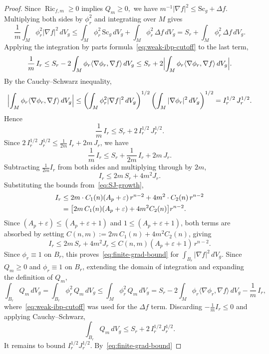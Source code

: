 \documentclass[12pt,oneside,a4paper]{article}
\theoremstyle{mytheorem}
\theoremstyle{remark}
\begin{document}
\begin{proof}
Since $\operatorname{Ric}_{f,m}\ge 0$ implies $Q_m\ge 0,$ we have
 $m^{-1}|\nabla f|^2\le\mathrm{Sc}_g+\Delta f$.  
Multiplying both sides by $\phi_r^2$ and integrating over $M$ gives
\[
  \frac{1}{m}\int_M \phi_r^2|\nabla f|^2\,dV_g
  \le \int_M \phi_r^2\,\mathrm{Sc}_g\,dV_g
    + \int_M \phi_r^2\,\Delta f\,dV_g
  = S_r + \int_M \phi_r^2\,\Delta f\,dV_g.
\]
Applying the integration by parts formula~\eqref{eq:weak-ibp-cutoff} to the
last term,
\[
  \frac{1}{m}\,I_r
  \le S_r - 2\int_M \phi_r\langle\nabla\phi_r,\nabla f\rangle\,dV_g
  \le S_r + 2\Bigl|\int_M \phi_r\langle\nabla\phi_r,\nabla f\rangle\,dV_g\Bigr|.
\]
By the Cauchy--Schwarz inequality,
\[
  \Bigl|\int_M \phi_r\langle\nabla\phi_r,\nabla f\rangle\,dV_g\Bigr|
  \le \left(\int_M \phi_r^2|\nabla f|^2\,dV_g\right)^{1/2}
     \left(\int_M |\nabla\phi_r|^2\,dV_g\right)^{1/2}
  = I_r^{1/2}\,J_r^{1/2}.
\]
Hence
\[
  \frac{1}{m}\,I_r \le S_r + 2\,I_r^{1/2}\,J_r^{1/2}.
\]
Since  $2\,I_r^{1/2}\,J_r^{1/2}
\le \tfrac{1}{2m}\,I_r + 2m\,J_r$, we have 
\[
  \frac{1}{m}\,I_r
  \le S_r + \frac{1}{2m}\,I_r + 2m\,J_r.
\]
Subtracting $\tfrac{1}{2m}I_r$ from both sides and multiplying through by $2m$,
\[
  I_r \le 2m\,S_r + 4m^2 J_r.
\]
Substituting the bounds from~\eqref{eq:SJ-growth},
\begin{align}
  I_r
  &\le 2m \cdot C_1(n)(A_p+\varepsilon)\,r^{n-2}
     + 4m^2 \cdot C_2(n)\,r^{n-2} \notag\\
  &= \bigl[2m\,C_1(n)(A_p+\varepsilon) + 4m^2 C_2(n)\bigr]r^{n-2}. \notag
\end{align}
Since $(A_p+\varepsilon) \le (A_p+\varepsilon+1)$ and $1 \le (A_p+\varepsilon+1)$,
both terms are absorbed by setting
$C(n,m) := 2m\,C_1(n)+4m^2 C_2(n)$, giving
\begin{equation}\label{eq:finite-grad-bound}
  I_r \le 2m\,S_r + 4m^2 J_r
     \le C(n,m)(A_p+\varepsilon+1)\,r^{n-2}.
\end{equation}
Since $\phi_r \equiv 1$ on $B_r$, this proves~\eqref{eq:finite-grad-bound}
for $\int_{B_r}|\nabla f|^2\,dV_g$.
Since $Q_m \ge 0$ and $\phi_r \equiv 1$ on $B_r$, extending the domain
of integration and expanding the definition of $Q_m$,
\[
  \int_{B_r} Q_m\,dV_g
  = \int_{B_r}\phi_r^2\,Q_m\,dV_g
  \le \int_M \phi_r^2\,Q_m\,dV_g
  = S_r
    - 2\int_M\phi_r\langle\nabla\phi_r,\nabla f\rangle\,dV_g
    - \frac{1}{m}\,I_r,
\]
where~\eqref{eq:weak-ibp-cutoff} was used for the $\Delta f$ term.
Discarding $-\tfrac{1}{m}I_r \le 0$ and applying Cauchy--Schwarz,
\[
  \int_{B_r} Q_m\,dV_g
  \le S_r + 2\,I_r^{1/2}J_r^{1/2}.
\]
 It remains to bound $I_r^{1/2}J_r^{1/2}$. By~\eqref{eq:finite-grad-bound}

\end{proof}
\end{document}
